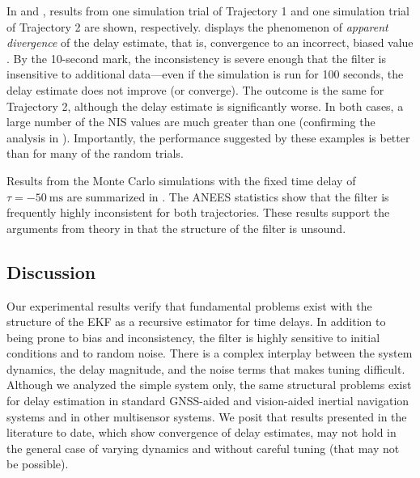 \documentclass[letterpaper,10pt,conference]{ieeeconf}
\theoremstyle{definition}
\begin{document}
In  and , results from one simulation trial of Trajectory 1 and one simulation trial of Trajectory 2 are shown, respectively.
%
 displays the phenomenon of \emph{apparent divergence} of the delay estimate, that is, convergence to an incorrect, biased value \cite{1974_Gelb_Applied}.
%
By the 10-second mark, the inconsistency is severe enough that the filter is insensitive to additional data---even if the simulation is run for 100 seconds, the delay estimate does not improve (or converge).
%
The outcome is the same for Trajectory 2, although the delay estimate is significantly worse.
%
In both cases, a large number of the NIS values are much greater than one (confirming the analysis in ).
%
Importantly, the performance suggested by these examples is better than for many of the random trials.

Results from the Monte Carlo simulations with the fixed time delay of $\tau = -50~\text{ms}$ are summarized in .
The ANEES statistics show that the filter is frequently highly inconsistent for both trajectories.  
%
These results support the arguments from theory in  that the structure of the filter is unsound.

\subsection{Discussion}
\label{subsec:discussion}

Our experimental results verify that fundamental problems exist with the structure of the EKF as a recursive estimator for time delays.
%
In addition to being prone to bias and inconsistency, the filter is highly sensitive to  initial conditions and to random noise.
%
There is a complex interplay between the system dynamics, the delay magnitude, and the noise terms that makes tuning difficult.
%
Although we analyzed the simple system  only, the same structural problems exist for delay estimation in standard GNSS-aided and vision-aided inertial navigation systems and in other multisensor systems.
%
We posit that results presented in the literature to date, which show convergence of delay estimates, may not hold in the general case of varying dynamics and without careful tuning (that may not be possible).
\end{document}
